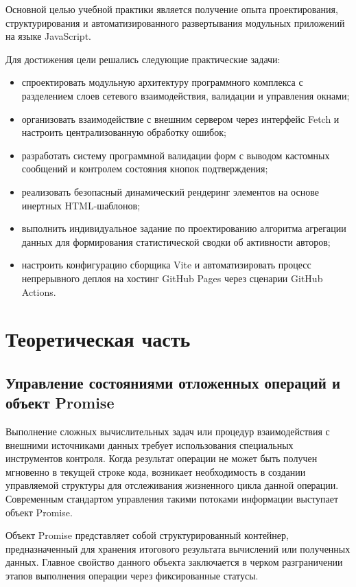 \documentclass[bachelor, och, pract, times]{SCWorks}
\begin{document}
Основной целью учебной практики является получение опыта проектирования,
структурирования и автоматизированного развертывания модульных приложений на
языке JavaScript.

Для достижения цели решались следующие практические задачи:
\begin{itemize}
    \item спроектировать модульную архитектуру программного комплекса с
      разделением слоев сетевого взаимодействия, валидации и управления окнами;
    \item организовать взаимодействие с внешним сервером через интерфейс Fetch
      и настроить централизованную обработку ошибок;
    \item разработать систему программной валидации форм с выводом кастомных
      сообщений и контролем состояния кнопок подтверждения;
    \item реализовать безопасный динамический рендеринг элементов на основе
      инертных HTML-шаблонов;
    \item выполнить индивидуальное задание по проектированию алгоритма
      агрегации данных для формирования статистической сводки об активности
      авторов;
    \item настроить конфигурацию сборщика Vite и автоматизировать процесс
      непрерывного деплоя на хостинг GitHub Pages через сценарии GitHub
      Actions.
\end{itemize}

\section{Теоретическая часть}
\subsection{Управление состояниями отложенных операций и объект Promise}
Выполнение сложных вычислительных задач или процедур взаимодействия с внешними
источниками данных требует использования специальных инструментов контроля.
Когда результат операции не может быть получен мгновенно в текущей строке кода,
возникает необходимость в создании управляемой структуры для отслеживания
жизненного цикла данной операции. Современным стандартом управления такими
потоками информации выступает объект Promise.

Объект Promise представляет собой структурированный контейнер, предназначенный
для хранения итогового результата вычислений или полученных данных. Главное
свойство данного объекта заключается в черком разграничении этапов выполнения
операции через фиксированные статусы.
\end{document}
